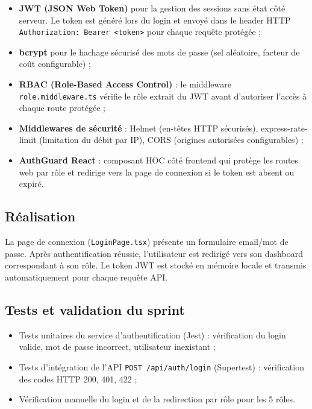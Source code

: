 \begin{itemize}
  \item \textbf{JWT (JSON Web Token)} pour la gestion des sessions sans état côté serveur. Le token est généré lors du login et envoyé dans le header HTTP \texttt{Authorization: Bearer <token>} pour chaque requête protégée ;
  \item \textbf{bcrypt} pour le hachage sécurisé des mots de passe (sel aléatoire, facteur de coût configurable) ;
  \item \textbf{RBAC (Role-Based Access Control)} : le middleware \texttt{role.middleware.ts} vérifie le rôle extrait du JWT avant d'autoriser l'accès à chaque route protégée ;
  \item \textbf{Middlewares de sécurité} : Helmet (en-têtes HTTP sécurisés), express-rate-limit (limitation du débit par IP), CORS (origines autorisées configurables) ;
  \item \textbf{AuthGuard React} : composant HOC côté frontend qui protège les routes web par rôle et redirige vers la page de connexion si le token est absent ou expiré.
\end{itemize}

\subsection{Réalisation}


La page de connexion (\texttt{LoginPage.tsx}) présente un formulaire email/mot de passe. Après authentification réussie, l'utilisateur est redirigé vers son dashboard correspondant à son rôle. Le token JWT est stocké en mémoire locale et transmis automatiquement pour chaque requête API.

\subsection{Tests et validation du sprint}

\begin{itemize}
  \item Tests unitaires du service d'authentification (Jest) : vérification du login valide, mot de passe incorrect, utilisateur inexistant ;
  \item Tests d'intégration de l'API \texttt{POST /api/auth/login} (Supertest) : vérification des codes HTTP 200, 401, 422 ;
  \item Vérification manuelle du login et de la redirection par rôle pour les 5 rôles.
\end{itemize}

